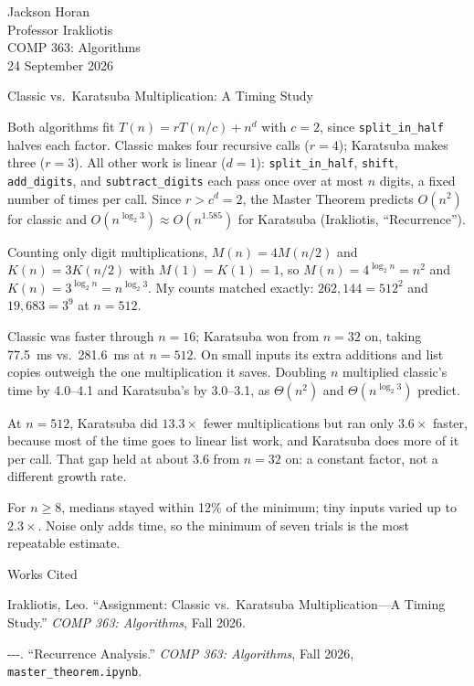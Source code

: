 \documentclass[12pt,letterpaper]{article}
\newcommand{\code}[1]{\texttt{#1}}
\begin{document}
\noindent Jackson Horan\\
Professor Irakliotis\\
COMP 363: Algorithms\\
24 September 2026

{\centering Classic vs.\ Karatsuba Multiplication: A Timing Study\par}

Both algorithms fit $T(n) = rT(n/c) + n^d$ with $c = 2$, since \code{split\_in\_half} halves each
factor. Classic makes four recursive calls ($r = 4$); Karatsuba makes three ($r = 3$). All other work is
linear ($d = 1$): \code{split\_in\_half}, \code{shift}, \code{add\_digits}, and \code{subtract\_digits}
each pass once over at most $n$ digits, a fixed number of times per call. Since $r > c^d = 2$, the Master
Theorem predicts $O(n^2)$ for classic and $O(n^{\log_2 3}) \approx O(n^{1.585})$ for Karatsuba
(Irakliotis, ``Recurrence'').

Counting only digit multiplications, $M(n) = 4M(n/2)$ and $K(n) = 3K(n/2)$ with $M(1) = K(1) = 1$, so
$M(n) = 4^{\log_2 n} = n^2$ and $K(n) = 3^{\log_2 n} = n^{\log_2 3}$. My counts matched exactly:
$262{,}144 = 512^2$ and $19{,}683 = 3^9$ at $n = 512$.

Classic was faster through $n = 16$; Karatsuba won from $n = 32$ on, taking 77.5~ms vs.\ 281.6~ms at
$n = 512$. On small inputs its extra additions and list copies outweigh the one multiplication it saves.
Doubling $n$ multiplied classic's time by 4.0--4.1 and Karatsuba's by 3.0--3.1, as $\Theta(n^2)$ and
$\Theta(n^{\log_2 3})$ predict.

At $n = 512$, Karatsuba did $13.3\times$ fewer multiplications but ran only $3.6\times$ faster, because
most of the time goes to linear list work, and Karatsuba does more of it per call. That gap held at about
3.6 from $n = 32$ on: a constant factor, not a different growth rate.

For $n \geq 8$, medians stayed within 12\% of the minimum; tiny inputs varied up to $2.3\times$. Noise
only adds time, so the minimum of seven trials is the most repeatable estimate.

\newpage

{\centering Works Cited\par}

\setlength{\parindent}{0pt}

Irakliotis, Leo. ``Assignment: Classic vs.\ Karatsuba Multiplication---A Timing Study.''
\emph{COMP 363: Algorithms}, Fall 2026.

{-}{-}{-}. ``Recurrence Analysis.'' \emph{COMP 363: Algorithms}, Fall 2026,
\code{master\_theorem.ipynb}.
\end{document}
